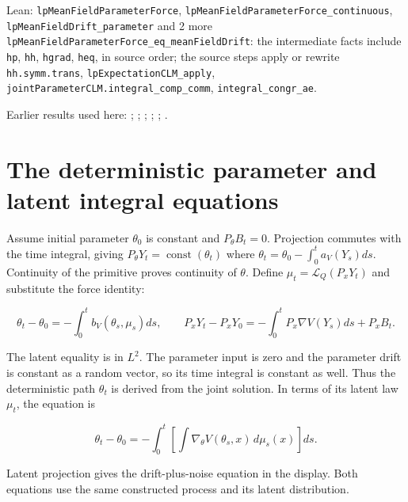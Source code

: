 \documentclass[11pt,a4paper]{article}
\begin{document}
\begin{leanbox}{Lean: \texttt{lpMeanFieldParameterForce}, \texttt{lpMeanFieldParameterForce\_\allowbreak{}continuous}, \texttt{lpMeanFieldDrift\_\allowbreak{}parameter} and 2 more}
\texttt{lp\allowbreak{}Mean\allowbreak{}Field\allowbreak{}Parameter\allowbreak{}Force\_\allowbreak{}eq\_\allowbreak{}mean\allowbreak{}Field\allowbreak{}Drift}: the intermediate facts include \texttt{hp}, \texttt{hh}, \texttt{hgrad}, \texttt{heq}, in source order; the source steps apply or rewrite \texttt{hh.\allowbreak{}symm.\allowbreak{}trans}, \texttt{lp\allowbreak{}Expectation\allowbreak{}CLM\_\allowbreak{}apply}, \texttt{joint\allowbreak{}Parameter\allowbreak{}CLM.\allowbreak{}integral\_\allowbreak{}comp\_\allowbreak{}comm}, \texttt{integral\_\allowbreak{}congr\_\allowbreak{}ae}.
\end{leanbox}


Earlier results used here: \cite[Section~3.13.2]{LangevinLean2026ULASC}; \cite[Section~3.13.3]{LangevinLean2026ULASC}; \cite[Section~3.13.4]{LangevinLean2026ULASC}; \cite[Section~3.13.5]{LangevinLean2026ULASC}; \cite[Section~3.1.1]{LangevinLean2026IPLA}; \cite[Section~3.11.1]{LangevinLean2026IPLA}.

\section{\texorpdfstring{The deterministic parameter and latent integral equations}{The deterministic parameter and latent integral equations}}


Assume initial parameter \(\theta_0\) is constant and \(P_\theta B_t=0\). Projection commutes with the time integral, giving \(P_\theta Y_t=\operatorname{const}(\theta_t)\) where \(\theta_t=\theta_0-\int_0^t a_V(Y_s)ds\). Continuity of the primitive proves continuity of \(\theta\). Define \(\mu_t=\mathcal L_Q(P_xY_t)\) and substitute the force identity:

\[\theta_t-\theta_0=-\int_0^t b_V(\theta_s,\mu_s)ds,\qquad P_xY_t-P_xY_0=-\int_0^tP_x\nabla V(Y_s)ds+P_xB_t.\]

The latent equality is in \(L^2\). The parameter input is zero and the parameter drift is constant as a random vector, so its time integral is constant as well. Thus the deterministic path \(\theta_t\) is derived from the joint solution. In terms of its latent law \(\mu_t\), the equation is

\[\theta_t-\theta_0=-\int_0^t\left[\int\nabla_\theta V(\theta_s,x)\,d\mu_s(x)\right]ds.\]

Latent projection gives the drift-plus-noise equation in the display. Both equations use the same constructed process and its latent distribution.
\end{document}
